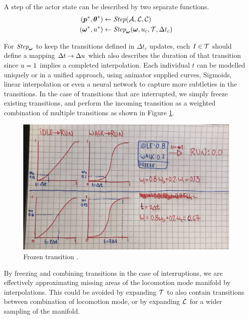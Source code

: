 A step of the actor state can be described by two separate functions.
\begin{subequations}
\begin{align}
    \left( \boldsymbol{p }^*, \boldsymbol{\theta }^* \right) &\leftarrow \textit{Step}( \mathcal{A}, \mathcal{L}, \mathcal{C}) \label{eq:step:kinematics}\\
    \left( \boldsymbol{\omega }^*, u{}^* \right) &\leftarrow  \textit{Step}_{\boldsymbol{\omega }}(
        \boldsymbol{\omega }, u_c, \mathcal{T}, \Delta{t}_c
        )\label{eq:step:animation}
\end{align}
\end{subequations}

For $\textit{Step}_{\boldsymbol{\omega }}$ to keep the transitions defined in $\Delta{t}_c$ updates, each $I\in\mathcal{T}$ should define a mapping $\Delta{t} \rightarrow \Delta u$ which also describes the duration of that transition since $u=1$ implies a completed interpolation. Each individual $t$ can be modelled uniquely or in a unified approach, using animator supplied curves, Sigmoids, linear interpolation or even a neural network to capture more subtleties in the transitions. In the case of transitions that are interrupted, we simply freeze existing transitions, and perform the incoming transition as a weighted combination of multiple transitions as shown in Figure \ref{fig:frozen-transition}. 
\begin{figure}
    \centering
    \includegraphics[width=0.75\columnwidth]{img/frozen-transitions}
    \caption{Frozen transition .}
  \label{fig:frozen-transition}
\end{figure}

By freezing and combining transitions in the case of interruptions, we are effectively approximating missing areas of the locomotion mode manifold by interpolations. This could be avoided by expanding $\mathcal{T}$ to also contain transitions between combination of locomotion mode, or by expanding $\mathcal{L}$ for a wider sampling of the manifold.


